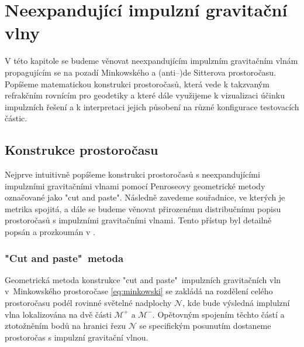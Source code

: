 \chapter{Neexpandující impulzní gravitační vlny}
V této kapitole se budeme věnovat neexpandujícím impulzním gravitačním vlnám propagujícím se na pozadí Minkowského a (anti--)de Sitterova
prostoročasu. Popíšeme matematickou konstrukci prostoročasů, která vede k takzvaným refrakčním rovnícím pro geodetiky a které dále využijeme k vizualizaci účinku
impulzních řešení a k interpretaci jejich působení na různé konfigurace testovacích částic.


\section{Konstrukce prostoročasu}
Nejprve intuitivně popíšeme konstrukci prostoročasů s neexpandujícími impulzními gravitačními vlnami
pomocí Penroseovy geometrické metody \cite{Penrose:1972xrn} označované jako "cut and paste". Následně zavedeme souřadnice, ve
kterých je metrika spojitá, a dále se budeme věnovat přirozenému distribučnímu popisu prostoročasů s impulzními gravitačními
vlnami. Tento přístup byl detailně popsán a prozkoumán v \cite{Podolsky:2014ysa}.

\subsection{"Cut and paste"\ metoda}
\label{sec:cut_and_paste_konstrukce1}
Geometrická metoda konstrukce "cut and paste"\ impulzních gravitačních vln v~Minkowského prostoročase \eqref{eq:minkowski} se zakládá na rozdělení celého prostoročasu podél rovinné
světelné nadplochy $\mathcal{N}$, kde bude výsledná implulzní vlna lokalizována na dvě části $\mathcal{M}^+$ a $\mathcal{M}^-$. Opětovným spojením těchto částí a ztotožněním bodů na hranici
řezu $\mathcal{N}$ se specifickým posunutím dostaneme prostoročas s impulzní gravitační vlnou.

